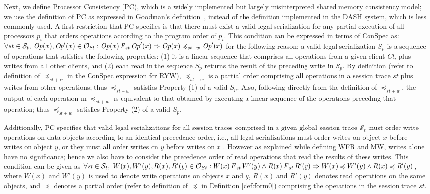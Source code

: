\documentclass[journal,compsoc]{IEEEtran}
\begin{document}
 Next, we define Processor Consistency (PC), which is a widely implemented but largely misinterpreted shared memory consistency model; we use the definition of PC as expressed in %
  Goodman's definition~\cite{Ahamad:1993:PPC:165231.165264}, instead of the definition implemented in the DASH system, which is less commonly used. A first restriction that PC  specifies is that  there must exist a valid legal serialization for  any partial execution of 
  all processors $p_i$ that orders operations according to the program order of $p_i$.  This condition can be expressed in terms of ConSpec as:
  $\forall \mathit{st} \in \mathcal{S}_t, \; {\mathit{Op}}(x), {\mathit{Op}}'(x) \in \mathcal{O}_{St} : \mathit{Op}(x) \operatorname{\it F}_\mathit{st} {\mathit{Op}}'(x) \Rightarrow  {\mathit{Op}}(x) \preccurlyeq_{\mathit{st}+w} {\mathit{Op}}'(x) $ %
for the following reason: a valid legal serialization $S_p$ is a sequence of operations that satisfies the following properties: (1) it is a linear sequence that comprises all operations from a given client $\mathit{Cl}_i$ plus writes from all other clients, and (2) each read in the sequence $S_p$ returns the result of the preceding write in $S_p$. By definition (refer to definition of $\preccurlyeq_{\mathit{st}+w}$ in the ConSpec expression for  RYW), $\preccurlyeq_{\mathit{st}+w}$ is a partial order  comprising all operations in a session trace $\mathit{st}$ plus writes from other operations; thus $\preccurlyeq_{\mathit{st}+w}$ satisfies Property (1) of a valid $S_p$.   Also, following directly from the definition of $\preccurlyeq_{\mathit{st}+w}$, the output of each operation in $\preccurlyeq_{\mathit{st}+w}$ is equivalent to that obtained by executing a linear sequence of the operations preceding that operation; thus $\preccurlyeq_{\mathit{st}+w}$ satisfies Property (2) of a valid $S_p$. 
  \par Additionally, PC specifies that  valid legal serializations for all session traces comprised in a given global session trace $\mathcal{S}_t$ must order write operations on data objects according to an identical precedence order, i.e., all legal serializations must order writes on object $x$ before writes on object $y$, or they must all order writes on $y$ before writes on $x$ .  However as explained while defining WFR and MW, writes alone have no significance; hence we also have to consider the precedence order of read operations that read the results of these writes. This condition can be given as $\forall \mathit{st} \in \mathcal{S}_t, \; W(x), W'(y), R(x), R'(y) \in \mathcal{O}_{St} :  W(x) \operatorname{\it F}_\mathit{st} W'(y) \wedge R(x) \operatorname{\it F}_\mathit{st} R'(y) \Rightarrow  W(x) \preccurlyeq W'(y) \wedge R(x) \preccurlyeq R'(y)$, where  $W(x)$ and $W'(y)$ is used to denote write operations on objects $x$ and $y$,  $R(x)$ and $R'(y)$ denotes read operations on the same objects, and $\preccurlyeq$ denotes a partial order (refer to definition of $\preccurlyeq$ in Definition \ref{def:form0}) comprising the operations in the session trace $\mathit{st}$. 
\end{document}
